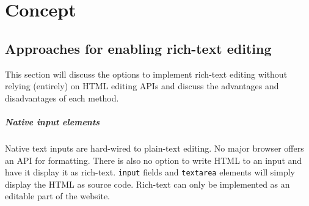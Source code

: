 \chapter{Concept}
\label{ch:concept}

\section{Approaches for enabling rich-text editing}


This section will discuss the options to implement rich-text editing without relying (entirely) on HTML editing APIs and discuss the advantages and disadvantages of each method. %

\paragraph{Native input elements} Native text inputs are hard-wired to plain-text editing. No major browser offers an API for formatting. There is also no option to write HTML to an input and have it display it as rich-text. \texttt{input} fields and \texttt{textarea} elements will simply display the HTML as source code. Rich-text can only be implemented as an editable part of the website.

